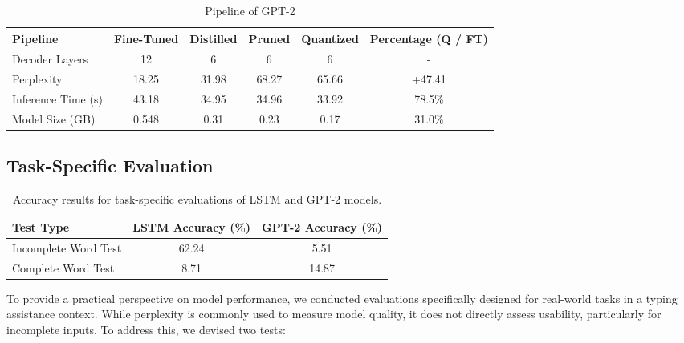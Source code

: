 \begin{table*}[h!]
    \centering
    \begin{tabular}{lccccc}
        \toprule
        \textbf{Pipeline}       & \textbf{Fine-Tuned} & \textbf{Distilled} & \textbf{Pruned} & \textbf{Quantized}  & \textbf{Percentage (Q / FT)} \\ \midrule
        Decoder Layers        & 12                  & 6                     & 6                & 6  &  -                    \\
        Perplexity      & 18.25               & 31.98                 & 68.27            & 65.66  &  +47.41                 \\
        Inference Time (s)    & 43.18               & 34.95                 & 34.96             & 33.92  &  78.5\%                  \\
        Model Size (GB)       & 0.548                & 0.31                  & 0.23             & 0.17   &  31.0\%                  \\ \bottomrule
    \end{tabular}
    \caption{Pipeline of GPT-2}
    \label{tab:GPT2_pipeline}
\end{table*}

\subsection{Task-Specific Evaluation}\label{subsec:task-specific-evaluation}
\begin{table}[!htbp]
    \centering
    \begin{tabular}{lcc}
        \toprule
        \textbf{Test Type}       & \textbf{LSTM Accuracy (\%)} & \textbf{GPT-2 Accuracy (\%)} \\ \midrule
        Incomplete Word Test     & 62.24                      & 5.51                         \\
        Complete Word Test       & 8.71                       & 14.87                        \\ \bottomrule
    \end{tabular}
    \caption{Accuracy results for task-specific evaluations of LSTM and GPT-2 models.}
    \label{tab:task_specific_results}
\end{table}

To provide a practical perspective on model performance, we conducted evaluations specifically designed for real-world tasks
in a typing assistance context.
While perplexity is commonly used to measure model quality, it does not directly assess usability, particularly for incomplete inputs.
To address this, we devised two tests:

